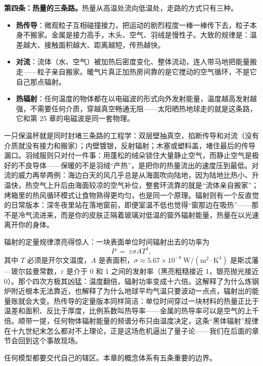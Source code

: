 \textbf{第四条：热量的三条路。}热量从高温处流向低温处，走路的方式只有三种。
\begin{itemize}[leftmargin=1.8em]
\item \textbf{热传导}：微观粒子互相碰撞接力，把运动的剧烈程度一棒一棒传下去，粒子本身不搬家。金属是接力高手，木头、空气、羽绒是慢性子。大致的规律是：温差越大、接触面积越大、距离越短，传热越快。
\item \textbf{对流}：流体（水、空气）被加热后密度变化、整体流动，连人带马地把能量搬走——粒子亲自搬家。暖气片真正加热房间靠的是它搅动的空气循环，不是它自己那点辐射。
\item \textbf{热辐射}：任何温度的物体都在以电磁波的形式向外发射能量，温度越高发射越强，不需要任何介质，穿越真空畅通无阻——太阳晒热地球走的就是这条路，它和第 25 章的电磁波是同一套物理。
\end{itemize}
一只保温杯就是同时封堵三条路的工程学：双层壁抽真空，掐断传导和对流（没有介质就没有接力和搬家）；内壁镀银，反射辐射；木塞或塑料盖，堵住最后的传导漏口。羽绒服则只对付一件事：用蓬松的绒朵锁住大量静止空气，而静止空气是极好的不良导体——保暖的不是羽绒“产热”，是把你的热量流出的速度压到最低。对流的威力再举两例：海边白天的风几乎总是从海面吹向陆地，因为陆地比热小、升温快，热空气上升后由海面较凉的空气补位，整套环流靠的就是“流体亲自搬家”；烤箱里的热风循环模式让食物熟得更均匀，也是同一个原理。辐射则有一个反直觉的日常版本：深冬夜里站在落地窗前，即便室温不低也觉得“窗那边在吸热”——那不是冷气流进来，而是你的皮肤正隔着玻璃对低温的窗外辐射能量，热量在以光速离开你的身体。

\begin{mathbridge}
辐射的定量规律漂亮得惊人：一块表面单位时间辐射出去的功率为
\[
P \;=\; \varepsilon \sigma A T^{4},
\]
其中 \(T\) 必须是开尔文温度，\(A\) 是表面积，\(\sigma \approx 5.67\times10^{-8}\ \mathrm{W/(m^{2}\cdot K^{4})}\) 是斯忒藩—玻尔兹曼常数，\(\varepsilon\) 是介于 0 和 1 之间的发射率（黑亮粗糙接近 1，银亮抛光接近 0）。那个四次方极其凶猛：温度翻倍，辐射功率变成十六倍。这解释了为什么炼钢炉附近根本无法靠近，也解释了为什么地球平均气温只要波动一点点，辐射出的能量账就会大变。热传导的定量版本同样简洁：单位时间穿过一块材料的热量正比于温差和面积、反比于厚度，比例系数叫热导率——金属的热导率可以是空气的上千倍。顺带一提，任何物体辐射能量的频谱分布只由温度决定，这条“黑体辐射”规律在十九世纪末怎么都对不上理论，正是这场危机逼出了量子论——我们在后面的章节会回到这个事故现场。
\end{mathbridge}


任何模型都要交代自己的辖区。本章的概念体系有五条重要的边界。

